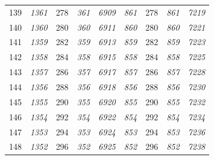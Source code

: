 \documentclass[10pt,fleqn]{article}
\begin{document}
\begin{longtable}{c|cccccccc}
139 & {\color{blue} \it 1361 \rm} & {\color{black} 278} & {\color{blue} \it 361 \rm} & {\color{blue} \it 6909 \rm} & {\color{blue} \it 861 \rm} & {\color{black} 278} & {\color{blue} \it 861 \rm} & {\color{blue} \it 7219 \rm} \\
140 & {\color{blue} \it 1360 \rm} & {\color{black} 280} & {\color{blue} \it 360 \rm} & {\color{blue} \it 6911 \rm} & {\color{blue} \it 860 \rm} & {\color{black} 280} & {\color{blue} \it 860 \rm} & {\color{blue} \it 7221 \rm} \\
141 & {\color{blue} \it 1359 \rm} & {\color{black} 282} & {\color{blue} \it 359 \rm} & {\color{blue} \it 6913 \rm} & {\color{blue} \it 859 \rm} & {\color{black} 282} & {\color{blue} \it 859 \rm} & {\color{blue} \it 7223 \rm} \\
142 & {\color{blue} \it 1358 \rm} & {\color{black} 284} & {\color{blue} \it 358 \rm} & {\color{blue} \it 6915 \rm} & {\color{blue} \it 858 \rm} & {\color{black} 284} & {\color{blue} \it 858 \rm} & {\color{blue} \it 7225 \rm} \\
143 & {\color{blue} \it 1357 \rm} & {\color{black} 286} & {\color{blue} \it 357 \rm} & {\color{blue} \it 6917 \rm} & {\color{blue} \it 857 \rm} & {\color{black} 286} & {\color{blue} \it 857 \rm} & {\color{blue} \it 7228 \rm} \\
144 & {\color{blue} \it 1356 \rm} & {\color{black} 288} & {\color{blue} \it 356 \rm} & {\color{blue} \it 6918 \rm} & {\color{blue} \it 856 \rm} & {\color{black} 288} & {\color{blue} \it 856 \rm} & {\color{blue} \it 7230 \rm} \\
145 & {\color{blue} \it 1355 \rm} & {\color{black} 290} & {\color{blue} \it 355 \rm} & {\color{blue} \it 6920 \rm} & {\color{blue} \it 855 \rm} & {\color{black} 290} & {\color{blue} \it 855 \rm} & {\color{blue} \it 7232 \rm} \\
146 & {\color{blue} \it 1354 \rm} & {\color{black} 292} & {\color{blue} \it 354 \rm} & {\color{blue} \it 6922 \rm} & {\color{blue} \it 854 \rm} & {\color{black} 292} & {\color{blue} \it 854 \rm} & {\color{blue} \it 7234 \rm} \\
147 & {\color{blue} \it 1353 \rm} & {\color{black} 294} & {\color{blue} \it 353 \rm} & {\color{blue} \it 6924 \rm} & {\color{blue} \it 853 \rm} & {\color{black} 294} & {\color{blue} \it 853 \rm} & {\color{blue} \it 7236 \rm} \\
148 & {\color{blue} \it 1352 \rm} & {\color{black} 296} & {\color{blue} \it 352 \rm} & {\color{blue} \it 6925 \rm} & {\color{blue} \it 852 \rm} & {\color{black} 296} & {\color{blue} \it 852 \rm} & {\color{blue} \it 7238 \rm} \\

\end{longtable}
\end{document}
